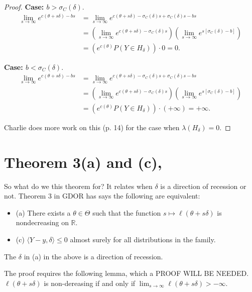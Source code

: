 \documentclass{amsbook}
\def\RR{{\mathbb R}}
\newcommand{\inner}[1]{\langle #1 \rangle}
\theoremstyle{definition}
\theoremstyle{remark}
\begin{document}
\begin{proof}
\textbf{Case: $b > \sigma_C(\delta)$}.
\begin{align*}
	\lim_{s\to \infty} e^{ c(\theta + s \delta ) - bs } &= 
	\lim_{s\to \infty} e^{ c(\theta + s \delta ) - \sigma_C(\delta)s + \sigma_C
(\delta)s - bs }  \\
	&= \left( \lim_{s\to \infty} e^{ c(\theta + s \delta ) - \sigma_C(\delta)s} 
\right ) \left(  \lim_{s\to \infty} e^{ s[ \sigma_C(\delta) - b] } \right )\\
	&= \left (e^{c(\theta) }P(Y\in H_\delta) \right ) \cdot 0 = 0.
\end{align*}

\textbf{Case: $b < \sigma_C(\delta)$}.
\begin{align*}
	\lim_{s\to \infty} e^{ c(\theta + s \delta ) - bs } &= 
	\lim_{s\to \infty} e^{ c(\theta + s \delta ) - \sigma_C(\delta)s + \sigma_C
(\delta)s - bs }  \\
	&= \left( \lim_{s\to \infty} e^{ c(\theta + s \delta ) - \sigma_C(\delta)s} 
\right ) \left(  \lim_{s\to \infty} e^{ s[ \sigma_C(\delta) - b] } \right )\\
	&= \left (e^{c(\theta) }P(Y\in H_\delta) \right ) \cdot \left ( + \infty \right ) 
= + \infty.
\end{align*}

Charlie does more work on this (p. 14) for the case when $\lambda(H_\delta) = 0$.
\end{proof}

\section{Theorem 3(a) and (c), \citet[p. 270]{Geyer:gdor}}
So what do we this theorem for?  It relates when $\delta$ is a direction of recession 
or not.  Theorem 3 in GDOR has says the following are equivalent:
\begin{itemize}
\item (a) There exists a $\theta \in \Theta$ such that the function $s \mapsto \ell
(\theta+s\delta)$ is nondecreasing on $\RR$.
\item (c) $\inner{Y-y, \delta} \leq 0$ almost surely for all distributions in the 
family.
\end{itemize}

The $\delta$ in (a) in the above is a direction of recession.  

The proof requires the following lemma, which a PROOF WILL BE NEEDED.
$\ell(\theta+s\delta)$ is non-dereasing if and only if $\lim_{s \to \infty} \ell
(\theta+s\delta) > -\infty$.
\end{document}
